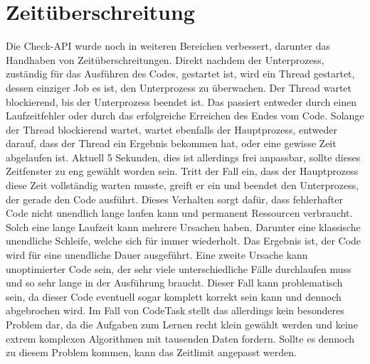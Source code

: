 \section{Zeitüberschreitung}
Die Check-API wurde noch in weiteren Bereichen verbessert, darunter das Handhaben von Zeitüberschreitungen. Direkt nachdem der Unterprozess, zuständig für das Ausführen des Codes, gestartet ist, wird ein Thread gestartet, dessen einziger Job es ist, den Unterprozess zu überwachen. Der Thread wartet blockierend, bis der Unterprozess beendet ist. Das passiert entweder durch einen Laufzeitfehler oder durch das erfolgreiche Erreichen des Endes vom Code. Solange der Thread blockierend wartet, wartet ebenfalls der Hauptprozess, entweder darauf, dass der Thread ein Ergebnis bekommen hat, oder eine gewisse Zeit abgelaufen ist. Aktuell 5 Sekunden, dies ist allerdings frei anpassbar, sollte dieses Zeitfenster zu eng gewählt worden sein. Tritt der Fall ein, dass der Hauptprozess diese Zeit vollständig warten musste, greift er ein und beendet den Unterprozess, der gerade den Code ausführt. Dieses Verhalten sorgt dafür, dass fehlerhafter Code nicht unendlich lange laufen kann und permanent Ressourcen verbraucht. Solch eine lange Laufzeit kann mehrere Ursachen haben. Darunter eine klassische unendliche Schleife, welche sich für immer wiederholt. Das Ergebnis ist, der Code wird für eine unendliche Dauer ausgeführt. Eine zweite Ursache kann unoptimierter Code sein, der sehr viele unterschiedliche Fälle durchlaufen muss und so sehr lange in der Ausführung braucht. Dieser Fall kann problematisch sein, da dieser Code eventuell sogar komplett korrekt sein kann und dennoch abgebrochen wird. Im Fall von CodeTask stellt das allerdings kein besonderes Problem dar, da die Aufgaben zum Lernen recht klein gewählt werden und keine extrem komplexen Algorithmen mit tausenden Daten fordern. Sollte es dennoch zu diesem Problem kommen, kann das Zeitlimit angepasst werden.


